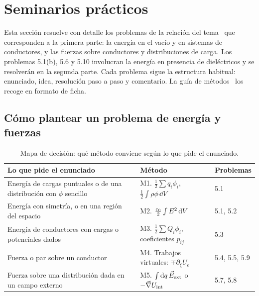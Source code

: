\section{Seminarios prácticos}\label{sec:seminarios}

Esta sección resuelve con detalle los problemas de la relación del tema~\cite{DFA-problemas} que corresponden a la primera parte: la energía en el
vacío y en sistemas de conductores, y las fuerzas sobre conductores y distribuciones de carga. Los problemas 5.1(b), 5.6 y 5.10 involucran la
energía en presencia de dieléctricos y se resolverán en la segunda parte. Cada problema sigue la estructura habitual: enunciado, idea, resolución
paso a paso y comentario. La guía de métodos~\cite{Guia-T5} los recoge en formato de ficha.

\subsection{Cómo plantear un problema de energía y fuerzas}\label{sec:plantear}

\begin{table}[H]
\centering
\caption{Mapa de decisión: qué método conviene según lo que pide el enunciado.}\label{tab:decision}
\small
\begin{tabularx}{\textwidth}{@{}>{\raggedright\arraybackslash}X>{\raggedright\arraybackslash}p{5.0cm}l@{}}
\toprule
Lo que pide el enunciado & Método & Problemas\\
\midrule
Energía de cargas puntuales o de una distribución con $\phi$ sencillo & M1. $\frac12\sum q_i\phi_i$,\ \ $\frac12\int\rho\phi\,\dd V$ & 5.1\\
Energía con simetría, o en una región del espacio & M2. $\frac{\varepsilon_0}{2}\int E^2\mathop{}\!\mathrm{d} V$ & 5.1, 5.2\\
Energía de conductores con cargas o potenciales dados & M3. $\frac12\sum Q_i\phi_i$, coeficientes $p_{ij}$ & 5.3\\
Fuerza o par sobre un conductor & M4. Trabajos virtuales: $\mp\partial_\xi U_e$ & 5.4, 5.5, 5.9\\
Fuerza sobre una distribución dada en un campo externo & M5. $\int\mathop{}\!\mathrm{d} q\,\vec E_{\mathrm{ext}}$ o $-\vec\nabla U_{\mathrm{int}}$ & 5.7, 5.8\\
\bottomrule
\end{tabularx}
\end{table}

